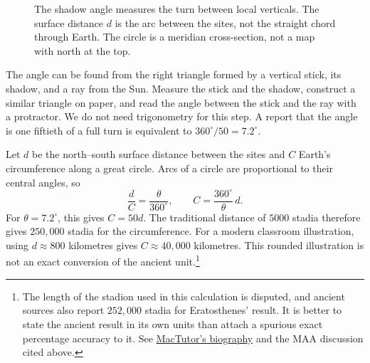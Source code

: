 \begin{figure}[htbp]\centering
{}
\caption{The shadow angle measures the turn between local verticals. The surface distance $d$ is the arc between the sites, not the straight chord through Earth. The circle is a meridian cross-section, not a map with north at the top.}
\label{fig:geo-eratosthenes}
\end{figure}

The angle can be found from the right triangle formed by a vertical stick,
its shadow, and a ray from the Sun. Measure the stick and the shadow,
construct a similar triangle on paper, and read the angle between the
stick and the ray with a protractor. We do not need trigonometry for this
step. A report that the angle is one fiftieth of a full turn is equivalent
to $360^\circ/50=7.2^\circ$.

Let $d$ be the north--south surface distance between the sites and $C$
Earth's circumference along a great circle. Arcs of a circle are
proportional to their central angles, so
\[
\frac{d}{C}=\frac{\theta}{360^\circ},\qquad
C=\frac{360^\circ}{\theta}\,d.
\]
For $\theta=7.2^\circ$, this gives $C=50d$. The traditional distance of
$5000$ stadia therefore gives $250{,}000$ stadia for the circumference.
For a modern classroom illustration, using $d\approx800$ kilometres gives
$C\approx40{,}000$ kilometres. This rounded illustration is not an exact
conversion of the ancient unit.\footnote{The length of the stadion used
in this calculation is disputed, and ancient sources also report
$252{,}000$ stadia for Eratosthenes' result. It is better to state the
ancient result in its own units than attach a spurious exact percentage
accuracy to it. See
\href{https://mathshistory.st-andrews.ac.uk/Biographies/Eratosthenes/}{MacTutor's biography}
and the MAA discussion cited above.}

